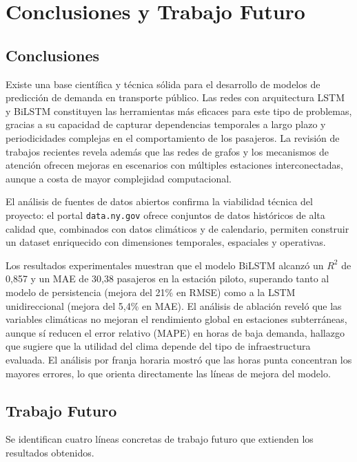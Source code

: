 \documentclass[preprint,12pt]{elsarticle}
\begin{document}
\section{Conclusiones y Trabajo Futuro}

\subsection{Conclusiones}

Existe una base científica y técnica sólida para el desarrollo de modelos de predicción de demanda en transporte público. Las redes con arquitectura LSTM y BiLSTM constituyen las herramientas más eficaces para este tipo de problemas, gracias a su capacidad de capturar dependencias temporales a largo plazo y periodicidades complejas en el comportamiento de los pasajeros. La revisión de trabajos recientes revela además que las redes de grafos y los mecanismos de atención ofrecen mejoras en escenarios con múltiples estaciones interconectadas, aunque a costa de mayor complejidad computacional.

El análisis de fuentes de datos abiertos confirma la viabilidad técnica del proyecto: el portal \texttt{data.ny.gov} ofrece conjuntos de datos históricos de alta calidad que, combinados con datos climáticos y de calendario, permiten construir un dataset enriquecido con dimensiones temporales, espaciales y operativas.

Los resultados experimentales muestran que el modelo BiLSTM alcanzó un $R^2$ de 0,857 y un MAE de 30,38 pasajeros en la estación piloto, superando tanto al modelo de persistencia (mejora del 21\% en RMSE) como a la LSTM unidireccional (mejora del 5,4\% en MAE). El análisis de ablación reveló que las variables climáticas no mejoran el rendimiento global en estaciones subterráneas, aunque sí reducen el error relativo (MAPE) en horas de baja demanda, hallazgo que sugiere que la utilidad del clima depende del tipo de infraestructura evaluada. El análisis por franja horaria mostró que las horas punta concentran los mayores errores, lo que orienta directamente las líneas de mejora del modelo.

\subsection{Trabajo Futuro}

Se identifican cuatro líneas concretas de trabajo futuro que extienden los resultados obtenidos.
\end{document}
